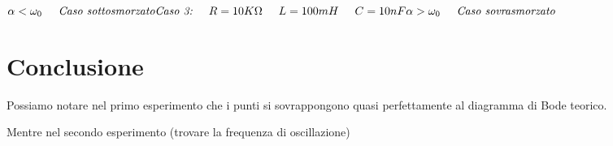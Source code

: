 \begin{math}
        \alpha < \omega_0 \hspace{0.5cm} \textit{Caso sottosmorzato} \\
        \\
        \textit{Caso 3:} \hspace{0.5cm} R = 10K\Omega \hspace{0.5cm} L = 100mH \hspace{0.5cm} C = 10nF \\
        \alpha > \omega_0 \hspace{0.5cm} \textit{Caso sovrasmorzato} \\
        \\
    \end{math}

    \section{Conclusione}
    Possiamo notare nel primo esperimento che i punti si sovrappongono quasi perfettamente al diagramma di Bode teorico.\par
    Mentre nel secondo esperimento (trovare la frequenza di oscillazione)
